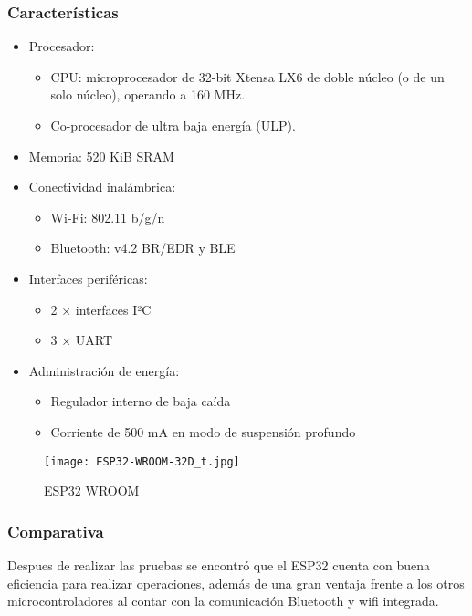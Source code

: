 \subsubsection{Características}
\begin{itemize}
    \item Procesador:
          \begin{itemize}
              \item CPU: microprocesador de 32-bit Xtensa LX6 de doble núcleo (o de un solo núcleo), operando a 160 MHz.
              \item Co-procesador de ultra baja energía (ULP).
          \end{itemize}
    \item Memoria: 520 KiB SRAM
    \item Conectividad inalámbrica:
          \begin{itemize}
              \item Wi-Fi: 802.11 b/g/n
              \item Bluetooth: v4.2 BR/EDR y BLE
          \end{itemize}
    \item Interfaces periféricas:
          \begin{itemize}
              \item 2 × interfaces I²C
              \item 3 × UART
          \end{itemize}
    \item Administración de energía:
          \begin{itemize}
              \item Regulador interno de baja caída
              \item Corriente de 500 mA en modo de suspensión profundo
          \end{itemize}
\end{itemize}

\begin{figure}[htp!]
    \centering
    \texttt{[image: ESP32-WROOM-32D\_t.jpg]}
    \caption{ESP32 WROOM}
    \label{fig: esp32}
\end{figure}
\FloatBarrier

\subsubsection{Comparativa}
Despues de realizar las pruebas se encontró que el ESP32 cuenta con buena eficiencia para realizar operaciones, además de una gran ventaja frente a los otros microcontroladores al contar con la comunicación Bluetooth y wifi integrada.

